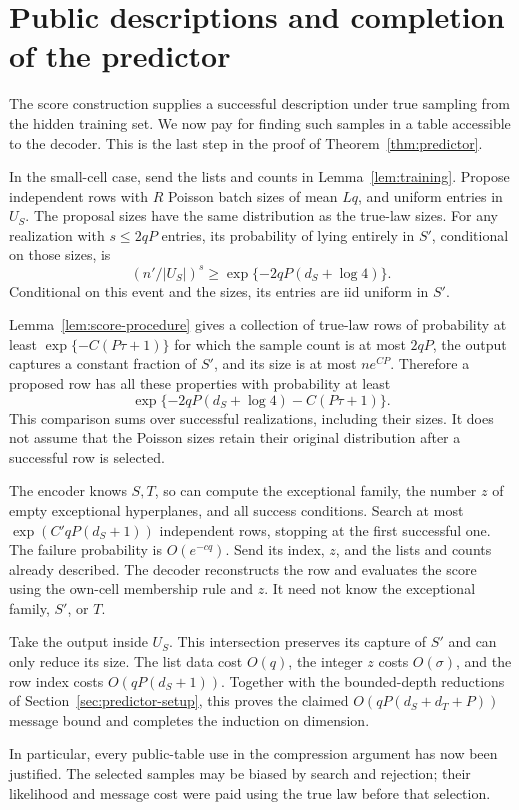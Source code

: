 \section{Public descriptions and completion of the predictor}
\label{sec:predictor-completion}

The score construction supplies a successful description under
true sampling from the hidden training set. We now pay for finding
such samples in a table accessible to the decoder. This is the
last step in the proof of Theorem~\ref{thm:predictor}.

In the small-cell case, send the lists and counts in
Lemma~\ref{lem:training}. Propose independent rows with \(R\)
Poisson batch sizes of mean \(Lq\), and uniform entries in \(U_S\).
The proposal sizes have the same distribution as the true-law
sizes. For any realization with \(s\le2qP\) entries, its probability
of lying entirely in \(S'\), conditional on those sizes, is
\[
 (n'/|U_S|)^s\ge
 \exp\{-2qP(d_S+\log4)\}.
\]
Conditional on this event and the sizes, its entries are iid
uniform in \(S'\).

Lemma~\ref{lem:score-procedure} gives a collection of true-law rows
of probability at least \(\exp\{-C(P\tau+1)\}\) for which the
sample count is at most \(2qP\), the output captures a constant
fraction of \(S'\), and its size is at most \(ne^{CP}\).
Therefore a proposed row has all these properties with probability
at least
\[
 \exp\{-2qP(d_S+\log4)-C(P\tau+1)\}.
\]
This comparison sums over successful realizations, including their
sizes. It does not assume that the Poisson sizes retain their
original distribution after a successful row is selected.

The encoder knows \(S,T\), so can compute the exceptional family,
the number \(z\) of empty exceptional hyperplanes, and all success
conditions. Search at most \(\exp(C'qP(d_S+1))\) independent rows,
stopping at the first successful one. The failure probability is
\(O(e^{-cq})\). Send its index, \(z\), and the lists and counts
already described. The decoder reconstructs the row and evaluates
the score using the own-cell membership rule and \(z\). It need
not know the exceptional family, \(S'\), or \(T\).

Take the output inside \(U_S\). This intersection preserves its
capture of \(S'\) and can only reduce its size. The list data cost
\(O(q)\), the integer \(z\) costs \(O(\sigma)\), and the row index
costs \(O(qP(d_S+1))\). Together with the bounded-depth reductions
of Section~\ref{sec:predictor-setup}, this proves the claimed
\(O(qP(d_S+d_T+P))\) message bound and completes the induction
on dimension.

In particular, every public-table use in the compression argument
has now been justified. The selected samples may be biased by
search and rejection; their likelihood and message cost were paid
using the true law before that selection.
